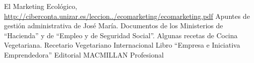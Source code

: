 \pagestyle{empty}
{\small
\begin{thebibliography}{biblio}
 El Marketing Ecológico, \url{http://ciberconta.unizar.es/leccion../ecomarketing/ecomarketing.pdf}
 Apuntes de gestión administrativa de José María.
 Documentos de los  Ministerios de “Hacienda” y de “Empleo y de Seguridad Social”.
 Algunas recetas de Cocina Vegetariana. Recetario Vegetariano Internacional
 Libro “Empresa e Iniciativa Emprendedora” Editorial MACMILLAN Profesional
\end{thebibliography}
}
